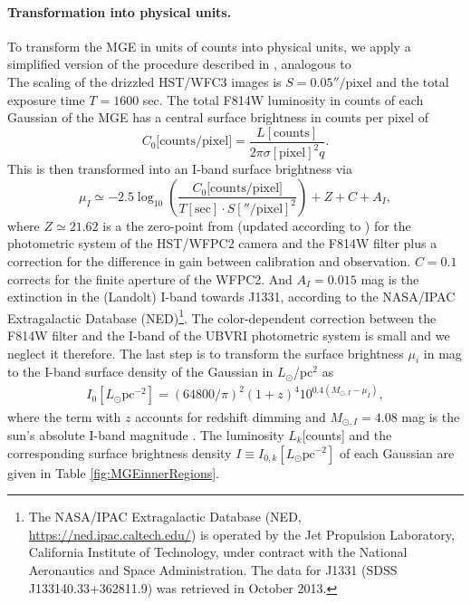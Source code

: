 \paragraph{Transformation into physical units.} To transform the MGE in units of counts into physical units, we apply a simplified version of the procedure described in \citet{Holtzman}, analogous to 
\\The scaling of the drizzled HST/WFC3 images is  $S = 0.05''/$pixel and the total exposure time $T = 1600$ sec. The total F814W luminosity in counts of each Gaussian of the MGE has a central surface brightness in counts per pixel of
\begin{equation*}
C_0\text{[counts/pixel]} = \frac{L[\text{counts}]}{2\pi \sigma[\text{pixel}]^2 q}.
\end{equation*}
This is then transformed into an I-band surface brightness via
\begin{equation}
\mu_I \simeq -2.5 \log_{10}\left( \frac{C_0\text{[counts/pixel]}}{T[\text{sec}] \cdot S[''/\text{pixel}]^2}\right) + Z + C + A_I, \label{eq:muI_}
\end{equation}
where $Z\simeq21.62$ is a the zero-point from \citet{Holtzman}  (updated according to \citet{Dolphin,DolphinNew}) for the photometric system of the HST/WFPC2 camera and the F814W filter plus a correction for the difference in gain between calibration and observation. $C= 0.1$ corrects for the finite aperture of the WFPC2. And $A_I =0.015$ mag  is the extinction in the (Landolt) I-band towards J1331, according to the NASA/IPAC Extragalactic Database (NED)\footnote{The NASA/IPAC Extragalactic Database (NED, \url{https://ned.ipac.caltech.edu/}) is operated by the Jet Propulsion Laboratory, California Institute of Technology, under contract with the National Aeronautics and Space Administration. The data for J1331 (SDSS J133140.33+362811.9) was retrieved in October 2013.}. The color-dependent correction between the F814W filter and the I-band of the UBVRI photometric system is  small \citep{Holtzman} and we neglect it therefore. The last step is to transform the surface brightness $\mu_i$ in mag to the I-band surface density of the Gaussian in $L_\odot$/pc$^2$ as
\begin{eqnarray*}
I_0[L_\odot \text{pc}^{-2}] = \left( 64800/\pi\right)^2 \left(1+z \right)^4 10^{0.4\left(M_{\odot,I}-\mu_I \right)},
\end{eqnarray*}
where the term with $z$ accounts for redshift dimming and $M_{\odot,I}=4.08$ mag is the sun's absolute I-band magnitude \citep{1998gaas.book.....B}. The luminosity $L_k$[counts] and the corresponding surface brightness density $I \equiv I_{0,k}[L_\odot \text{pc}^{-2}]$ of each Gaussian are given in Table \ref{fig:MGEinnerRegions}. 

